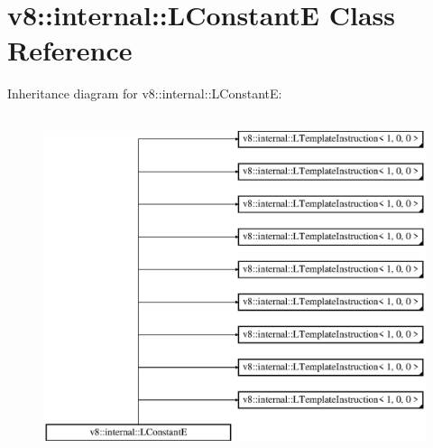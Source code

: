 \hypertarget{classv8_1_1internal_1_1_l_constant_e}{}\section{v8\+:\+:internal\+:\+:L\+ConstantE Class Reference}
\label{classv8_1_1internal_1_1_l_constant_e}
Inheritance diagram for v8\+:\+:internal\+:\+:L\+ConstantE\+:\begin{figure}[H]
\begin{center}
\leavevmode
\includegraphics[height=10.000000cm]{classv8_1_1internal_1_1_l_constant_e}
\end{center}
\end{figure}

